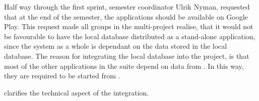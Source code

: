 Half way through the first sprint, semester coordinator Ulrik Nyman, requested that at the end of the semester, the applications should be available on Google Play.
This request made all groups in the multi-project realise, that it would not be favourable to have the local database distributed as a stand-alone application, since the \giraf system as a whole is dependant on the data stored in the local database.
The reason for integrating the local database into the \launcher project, is that most of the other applications in the \giraf suite depend on data from \launcher.
In this way, they are required to be started from \launcher.

 clarifies the technical aspect of the integration.